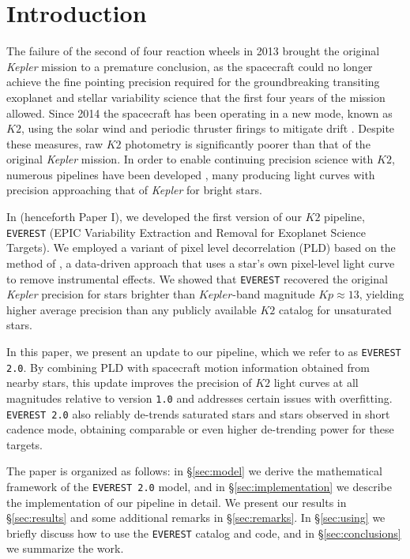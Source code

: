 \documentclass[]{emulateapj}
\newcommand{\Kp}{\ensuremath{Kp}}
\begin{document}
\section{Introduction}
\label{sec:intro}
The failure of the second of four reaction wheels in 2013 brought the original
\emph{Kepler} mission to a premature conclusion, as the spacecraft could no longer
achieve the fine pointing precision required for the groundbreaking
transiting exoplanet and stellar variability science that the first four years of the
mission allowed. Since 2014 the spacecraft has been operating in a new mode, known
as $K2$, using the solar wind and periodic thruster firings to mitigate drift
\citep{Howell14}. Despite these measures, raw $K2$ photometry is significantly
poorer than that of the original \emph{Kepler} mission. In order to enable
continuing precision science with $K2$, numerous pipelines have been developed
\citep[e.g.,][]{VanderburgJohnson14,Armstrong15,Lund15,Crossfield15,ForemanMackey15,Huang15,Aigrain16},
many producing light curves with precision approaching that of \emph{Kepler} for
bright stars.

In \cite{Luger16} (henceforth Paper I), we developed the first version of our 
$K2$ pipeline, \texttt{EVEREST} (EPIC Variability Extraction and Removal for Exoplanet
Science Targets).
We employed a variant of pixel level decorrelation (PLD) based on the method of \cite{Deming15},
a data-driven approach that uses a star's own pixel-level light curve to remove
instrumental effects. We showed that \texttt{EVEREST} recovered the original \emph{Kepler} 
precision for stars brighter than $Kepler$-band magnitude $\Kp \approx 13$, yielding higher 
average precision than any publicly available $K2$ catalog for unsaturated stars.

In this paper, we present an update to our pipeline, which we refer to as \texttt{EVEREST 2.0}.
By combining PLD with spacecraft motion information obtained from nearby stars,
this update improves the precision of $K2$ light curves at all magnitudes relative to version \texttt{1.0} and addresses
certain issues with overfitting. \texttt{EVEREST 2.0} also reliably de-trends saturated
stars and stars observed in short cadence mode, obtaining comparable or even higher de-trending
power for these targets.

The paper is organized as follows: in \S\ref{sec:model} we derive the mathematical
framework of the \texttt{EVEREST 2.0} model, and in \S\ref{sec:implementation} we describe 
the implementation of our pipeline in detail. We present our results in \S\ref{sec:results}
and some additional remarks in \S\ref{sec:remarks}. In \S\ref{sec:using} we briefly discuss how
to use the \texttt{EVEREST} catalog and code, and in \S\ref{sec:conclusions} we 
summarize the work.
\end{document}
